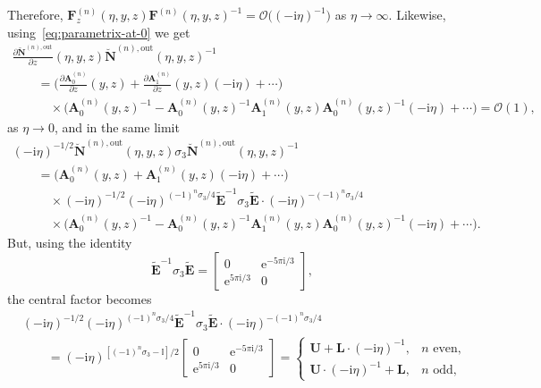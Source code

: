 \documentclass[pdftex]{sigma}
\numberwithin{equation}{section}
\begin{document}
Therefore, $\mathbf{F}^{(n)}_z(\eta,y,z)\mathbf{F}^{(n)}(\eta,y,z)^{-1}=\mathcal{O}\bigl((-\mathrm{i}\eta)^{-1}\bigr)$ as $\eta\to\infty$. Likewise, using~\eqref{eq:parametrix-at-0} we get
\begin{gather*}
\frac{\partial\breve{\mathbf{N}}^{(n),\mathrm{out}}}{\partial z}(\eta,y,z)\breve{\mathbf{N}}^{(n),\mathrm{out}}(\eta,y,z)^{-1}\\
\qquad {}=\bigg(\frac{\partial\mathbf{A}^{(n)}_0}{\partial z}(y,z) + \frac{\partial\mathbf{A}^{(n)}_1}{\partial z}(y,z) (-\mathrm{i}\eta) +\cdots\bigg)\\
\qquad\quad{}\times\bigl(\mathbf{A}^{(n)}_0(y,z)^{-1} - \mathbf{A}^{(n)}_0(y,z)^{-1}\mathbf{A}^{(n)}_1(y,z)\mathbf{A}_0^{(n)}(y,z)^{-1}(-\mathrm{i}\eta) + \cdots\bigr)=\mathcal{O}(1),
\end{gather*}
as $\eta\to 0$, and in the same limit
\begin{gather*}
(-\mathrm{i}\eta)^{-1/2}\breve{\mathbf{N}}^{(n),\mathrm{out}}(\eta,y,z)\sigma_3\breve{\mathbf{N}}^{(n),\mathrm{out}}(\eta,y,z)^{-1}\\
\qquad =\bigl(\mathbf{A}_0^{(n)}(y,z) + \mathbf{A}_1^{(n)}(y,z)(-\mathrm{i}\eta) + \cdots\bigr)\\
\qquad\quad{}\times (-\mathrm{i}\eta)^{-1/2}(-\mathrm{i}\eta)^{(-1)^n\sigma_3/4}\widetilde{\mathbf{E}}^{-1}\sigma_3\widetilde{\mathbf{E}}\cdot(-\mathrm{i}\eta)^{-(-1)^n\sigma_3/4}\\
\qquad\quad{}\times\bigl(\mathbf{A}^{(n)}_0(y,z)^{-1}-\mathbf{A}_0^{(n)}(y,z)^{-1}\mathbf{A}_1^{(n)}(y,z)\mathbf{A}_0^{(n)}(y,z)^{-1}(-\mathrm{i}\eta) + \cdots\bigr).
\end{gather*}
But, using the identity
\begin{equation*}
\widetilde{\mathbf{E}}^{-1}\sigma_3\widetilde{\mathbf{E}} = \begin{bmatrix}0 & \mathrm{e}^{-5\pi\mathrm{i}/3}\\\mathrm{e}^{5\pi\mathrm{i}/3} & 0\end{bmatrix},
\end{equation*}
the central factor becomes{\samepage
\begin{align}
& (-\mathrm{i}\eta)^{-1/2}(-\mathrm{i}\eta)^{(-1)^n\sigma_3/4}\widetilde{\mathbf{E}}^{-1}\sigma_3\widetilde{\mathbf{E}}\cdot(-\mathrm{i}\eta)^{-(-1)^n\sigma_3/4}
\nonumber\\
&\qquad =(-\mathrm{i}\eta)^{[(-1)^n\sigma_3-\mathbb{I}]/2}\begin{bmatrix}0 & \mathrm{e}^{-5\pi\mathrm{i}/3}\\\mathrm{e}^{5\pi\mathrm{i}/3} & 0\end{bmatrix} =\begin{cases}\mathbf{U} + \mathbf{L}\cdot(-\mathrm{i}\eta)^{-1},&\text{$n$ even}, \\\mathbf{U}\cdot(-\mathrm{i}\eta)^{-1} + \mathbf{L},&\text{$n$ odd},\end{cases} \label{eq:central-factor}
 \end{align}}%
\end{document}
